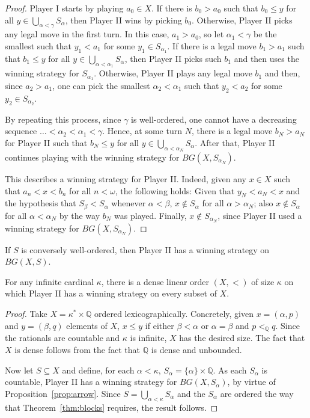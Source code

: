 \begin{proof}
    Player I starts by playing $a_0\in X$.
    If there is $b_0>a_0$ such that $b_0\leq y$ for all $y\in\bigcup_{\alpha<\gamma}S_\alpha$, then Player II wins by picking $b_0$.
    Otherwise, Player II picks any legal move in the first turn.
    In this case, $a_1>a_0$, so let $\alpha_1<\gamma$ be the smallest such that $y_1<a_1$ for some $y_1\in S_{\alpha_1}$.
    If there is a legal move $b_1>a_1$ such that $b_1\leq y$ for all $y\in\bigcup_{\alpha<\alpha_1}S_\alpha$, then Player II picks such $b_1$ and then uses the winning strategy for $S_{\alpha_1}$.
    Otherwise, Player II plays any legal move $b_1$ and then, since $a_2>a_1$, one can pick the smallest $\alpha_2<\alpha_1$ such that $y_{2}<a_2$ for some $y_2\in S_{\alpha_2}$.
    
    By repeating this process, since $\gamma$ is well-ordered, one cannot have a decreasing sequence $\dots<\alpha_2<\alpha_1<\gamma$.
    Hence, at some turn $N$, there is a legal move $b_N>a_N$ for Player II such that $b_N\leq y$ for all $y\in\bigcup_{\alpha<\alpha_N}S_\alpha$.
    After that, Player II continues playing with the winning strategy for $BG(X,S_{\alpha_N})$.
    
    This describes a winning strategy for Player II.
    Indeed, given any $x\in X$ such that $a_n<x<b_n$ for all $n<\omega$, the following holds:
    Given that $y_N<a_N<x$ and the hypothesis that $S_\beta<S_\alpha$ whenever $\alpha<\beta$, $x\notin S_{\alpha}$ for all $\alpha>\alpha_N$; also $x\notin S_{\alpha}$ for all $\alpha<\alpha_N$ by the way $b_N$ was played.
    Finally, $x\notin S_{\alpha_N}$, since Player II used a winning strategy for $BG(X,S_{\alpha_N})$.
\end{proof}

\begin{corollary}
    If $S$ is conversely well-ordered, then Player II has a winning strategy on $BG(X,S)$.
\end{corollary}

\begin{corollary}\label{cor:any_kappa}
    For any infinite cardinal $\kappa$, there is a dense linear order $(X,<)$ of size $\kappa$ on which Player II has a winning strategy on every subset of $X$.
\end{corollary}

\begin{proof}
    Take $X=\kappa^*\times\mathbb Q$ ordered lexicographically.
    Concretely, given $x=(\alpha,p)$ and $y=(\beta, q)$ elements of $X$, $x\leq y$ if either $\beta<\alpha$ or $\alpha=\beta$ and $p<_\mathbb Qq$.
    Since the rationals are countable and $\kappa$ is infinite, $X$ has the desired size.
    The fact that $X$ is dense follows from the fact that $\mathbb Q$ is dense and unbounded.

    Now let $S\subseteq X$ and define, for each $\alpha<\kappa$, $S_\alpha=\{\alpha\}\times\mathbb Q$.
    As each $S_\alpha$ is countable, Player II has a winning strategy for $BG(X,S_\alpha)$, by virtue of Proposition~\ref{prop:arrow}.
    Since $S=\bigcup_{\alpha<\kappa}S_\alpha$ and the $S_\alpha$ are ordered the way that Theorem~\ref{thm:blocks} requires, the result follows.
\end{proof}